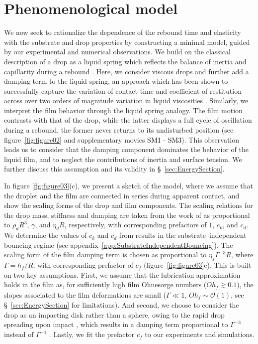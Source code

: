 \documentclass[]{jfm}
\newcommand*\red{\textcolor{black}}
\newcommand{\revRev}[1]{\textcolor{black}{#1}}
\newcommand{\Ohf}{\mathit{Oh}_\mathit{f}}
\begin{document}
	\section{Phenomenological model} \label{sec:Phenomenological_model}
	
	We now seek to rationalize the dependence of the rebound time and elasticity with the substrate and drop properties by constructing a minimal model, guided by our experimental and numerical observations. We build on the classical description of a drop as a liquid spring which reflects the balance of inertia and capillarity during a rebound \citep{richard2002contact,okumura2003water}. Here, we consider viscous drops and further add a damping term to the liquid spring, an approach which has been shown to successfully capture the variation of contact time and coefficient of restitution across over two orders of magnitude variation in liquid viscosities \citep{jha2020viscous}. Similarly, we interpret the film behavior through the liquid spring analogy. The film motion contrasts with that of the drop, while the latter displays a full cycle of oscillation during a rebound, the former never returns to its undisturbed position (see figure~\ref{fig:figure02} and supplementary movies \red{SM1} - \red{SM3}). This observation leads us to consider that the damping component dominates the behavior of the liquid film, and to neglect the contributions of inertia and surface tension. We further discuss this assumption and its validity in \S~\ref{sec:EnergySection}. 
	
	In figure \ref{fig:figure03}(c), we present a sketch of the model, where we assume that the droplet and the film are connected in series during apparent contact, and show the scaling forms of the drop and film components. The scaling relations for the drop mass, stiffness and damping are taken from the work of \citet{jha2020viscous} as proportional to \revRev{$\rho_d R^3$, $\gamma$}, and $\eta_d R$, respectively, with corresponding prefactors of $1$, $c_k$, and $c_d$. We determine the values of $c_k$ and $c_d$ from results in the substrate--independent bouncing regime (see appendix~\ref{app:SubstrateIndependentBouncing}).
	The scaling form of the film damping term is chosen as proportional to $\eta_{f} \Gamma^{-3} R$, where $\Gamma = h_f/R$, with corresponding prefactor of $c_{f}$ (figure~\ref{fig:figure03}c). 
	This is built on two key assumptions. First, we assume that the lubrication approximation holds in the film as, for sufficiently high film Ohnesorge numbers ($\Ohf \gtrsim 0.1$), the slopes associated to the film deformations are small ($\Gamma \ll 1$, $\Ohf \sim \mathcal{O}\left(1\right)$, see \S~\ref{sec:EnergySection} for limitations).
	And second, we choose to consider the drop as an impacting disk rather than a sphere, owing to the rapid drop spreading upon impact \citep{eggers2010drop, wildeman-2016-jfm}, which results in a damping term proportional to $\Gamma^{-3}$ instead of $\Gamma^{-1}$ \citep{leal2007advanced}. Lastly, we fit the prefactor $c_f$ to our experiments and simulations.
	
\end{document}
